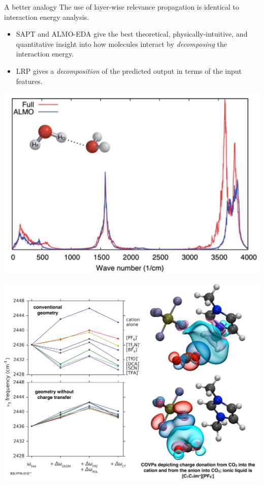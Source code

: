 \documentclass[xetex,compress]{beamer}
\begin{document}
\begin{frame}{A better analogy}
  The use of layer-wise relevance propagation is identical to interaction energy analysis.
  \begin{itemize}
  \item SAPT and ALMO-EDA give the best theoretical, physically-intuitive, and quantitative insight into how molecules interact by \emph{decomposing} the interaction energy.
  \item LRP gives a \emph{decomposition} of the predicted output in terms of the input features.
  \end{itemize}
\end{frame}

\begin{frame}{}
  \begin{center}
    \includegraphics[scale=0.50]{./figures/almo_water_combined.pdf}
  \end{center}
\end{frame}

\begin{frame}{}
  \begin{center}
    \includegraphics[scale=0.30]{./figures/slide_ionic_liquid.pdf}
  \end{center}
\end{frame}
\end{document}
